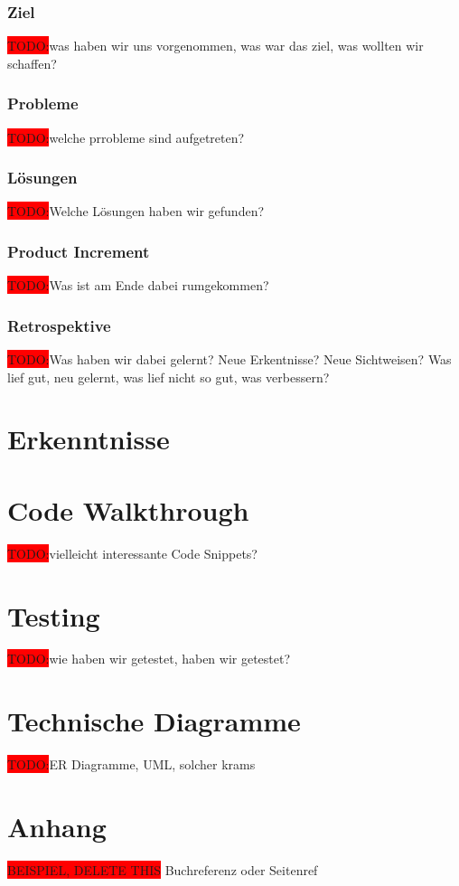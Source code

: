 \documentclass[10pt, a4paper, draft]{article}
\begin{document}
\subsubsection{Ziel}
\colorbox{red}{TODO:}was haben wir uns vorgenommen, was war das ziel, was wollten wir schaffen?
\subsubsection{Probleme}
\colorbox{red}{TODO:}welche prrobleme sind aufgetreten?

\subsubsection{Lösungen}
\colorbox{red}{TODO:}Welche Lösungen haben wir gefunden?

\subsubsection{Product Increment}
\colorbox{red}{TODO:}Was ist am Ende dabei rumgekommen?

\subsubsection{Retrospektive}
\colorbox{red}{TODO:}Was haben wir dabei gelernt? Neue Erkentnisse? Neue Sichtweisen?
Was lief gut, neu gelernt, was lief nicht so gut, was verbessern?

\section{Erkenntnisse}

\section{Code Walkthrough}
\colorbox{red}{TODO:}vielleicht interessante Code Snippets?

\section{Testing}
\colorbox{red}{TODO:}wie haben wir getestet, haben wir getestet?

\section{Technische Diagramme}
\colorbox{red}{TODO:}ER Diagramme, UML, solcher krams

\newpage
\section{Anhang}
\colorbox{red}{BEISPIEL, DELETE THIS} Buchreferenz \cite{Literaturbeispiel:tom} oder Seitenref \cite{google}
\printbibliography
\end{document}

